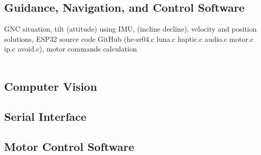 \subsection{Guidance, Navigation, and Control Software}
\noindent GNC situation, tilt (attitude) using IMU, (incline decline), velocity and position solutions, ESP32 source code GitHub (hc-sr04.c luna.c haptic.c audio.c motor.c ip.c avoid.c), motor commands calculation\\

\\

\subsection{Computer Vision}

\subsection{Serial Interface}

\subsection{Motor Control Software}